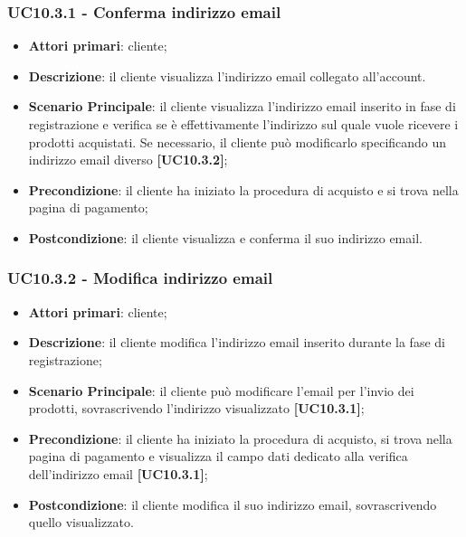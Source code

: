 \subsubsection{UC10.3.1 - Conferma indirizzo email}
\begin{itemize}
\item \textbf{Attori primari}: cliente;
\item \textbf{Descrizione}: il cliente visualizza l'indirizzo email collegato all'account.
\item \textbf{Scenario Principale}: il cliente visualizza l'indirizzo email inserito in fase di registrazione e verifica se è effettivamente l'indirizzo sul quale vuole ricevere i prodotti acquistati. Se necessario, il cliente può modificarlo specificando un indirizzo email diverso \textbf{[UC10.3.2]};
\item \textbf{Precondizione}:  il cliente ha iniziato la procedura di acquisto e si trova nella pagina di pagamento;
\item \textbf{Postcondizione}: il cliente visualizza e conferma il suo indirizzo email.
\end{itemize}

\subsubsection{UC10.3.2 - Modifica indirizzo email}
\begin{itemize}
\item \textbf{Attori primari}: cliente;
\item \textbf{Descrizione}: il cliente modifica l'indirizzo email inserito durante la fase di registrazione;
\item \textbf{Scenario Principale}: il cliente può modificare l'email per l'invio dei prodotti, sovrascrivendo l'indirizzo visualizzato \textbf{[UC10.3.1]};
\item \textbf{Precondizione}:  il cliente ha iniziato la procedura di acquisto, si trova nella pagina di pagamento e visualizza il campo dati dedicato alla verifica dell'indirizzo email \textbf{[UC10.3.1]};
\item \textbf{Postcondizione}: il cliente modifica il suo indirizzo email, sovrascrivendo quello visualizzato.
\end{itemize}

